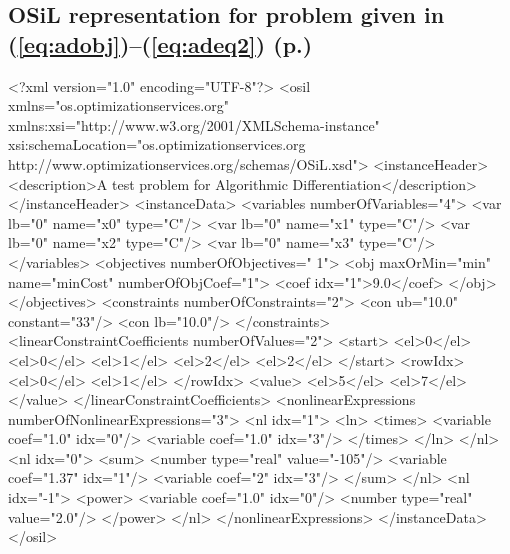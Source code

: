 \documentclass[11pt]{article}
\newcommand{\bibpath}{/Users/kmartin/Documents/files/misc}
\renewcommand{\_}{{\char"5F}}
\renewcommand{\{}{{\char"7B}}
\renewcommand{\}}{{\char"7D}}
\renewcommand{\^}{{\char"0D}}
\renewcommand{\'}{{\char"0D}}
\begin{document}
\subsection{OSiL representation for problem given in (\ref{eq:adobj})--(\ref{eq:adeq2}) (p.\pageref{eq:adobj})
}\label{section:adexample}

\begin{verbatimtab}
<?xml version="1.0" encoding="UTF-8"?>
<osil  xmlns="os.optimizationservices.org" 
     xmlns:xsi="http://www.w3.org/2001/XMLSchema-instance"
     xsi:schemaLocation="os.optimizationservices.org 
     http://www.optimizationservices.org/schemas/OSiL.xsd">
	<instanceHeader>
		<description>A test problem for Algorithmic Differentiation</description>
	</instanceHeader>
	<instanceData>
		<variables numberOfVariables="4">
			<var lb="0" name="x0" type="C"/>
			<var lb="0" name="x1" type="C"/>
			<var lb="0" name="x2" type="C"/>
			<var lb="0" name="x3" type="C"/>
		</variables>
		<objectives numberOfObjectives=" 1">
			<obj maxOrMin="min" name="minCost" numberOfObjCoef="1">
				<coef idx="1">9.0</coef>
			</obj>
		</objectives>
		<constraints numberOfConstraints="2">
			<con ub="10.0" constant="33"/>
			<con lb="10.0"/>
		</constraints>
		<linearConstraintCoefficients numberOfValues="2">
			<start>
				<el>0</el>
				<el>0</el>
				<el>1</el>
				<el>2</el>
				<el>2</el>
			</start>
			<rowIdx>
				<el>0</el>
				<el>1</el>
			</rowIdx>
			<value>
				<el>5</el>
				<el>7</el>
			</value>
		</linearConstraintCoefficients>
		<nonlinearExpressions numberOfNonlinearExpressions="3">
			<nl idx="1">
				<ln>
					<times>
						<variable coef="1.0" idx="0"/>
						<variable coef="1.0" idx="3"/>
					</times>	
				</ln>
			</nl>
			<nl idx="0">
				<sum>
					<number type="real" value="-105"/>
					<variable coef="1.37" idx="1"/>
					<variable coef="2" idx="3"/>
				</sum>	
			</nl>
			<nl idx="-1">
				<power>
					<variable coef="1.0" idx="0"/>
					<number type="real" value="2.0"/>
				</power>
			</nl>
		</nonlinearExpressions>
	</instanceData>
</osil>
\end{verbatimtab}


\end{document}
